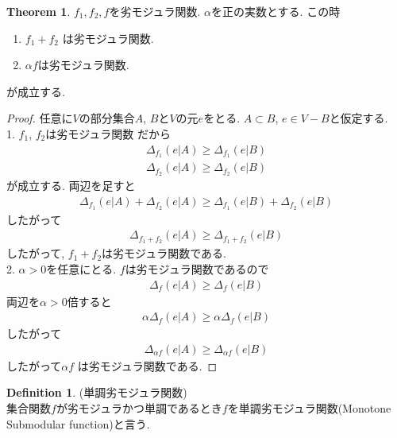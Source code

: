 \documentclass[11pt, a4paper, dvipdfmx]{jsarticle}
\theoremstyle{definition}
\newtheorem{Definition+}[Axiom+]{Definition}
\newtheorem{Theorem+}[Axiom+]{Theorem}
\begin{document}
\begin{Theorem+}
    $f_{1}, f_{2}, f$を劣モジュラ関数. $\alpha$を正の実数とする. この時
    \begin{enumerate}
        \item $f_{1} + f_{2} $ は劣モジュラ関数.
        \item $\alpha f$は劣モジュラ関数.
    \end{enumerate}
    が成立する.
    \begin{proof}
        任意に$V$の部分集合$A$, $B$と$V$の元$e$をとる. $A\subset B$, $e\in V - B$と仮定する.\\
        1. $f_{1}$, $f_{2}$は劣モジュラ関数 だから
        \begin{align*}
            \Delta_{f_{1}}(e|A)\geq \Delta_{f_{1}}(e|B)
        \end{align*}
        \begin{align*}
            \Delta_{f_{2}}(e|A)\geq \Delta_{f_{2}}(e|B)
        \end{align*}
        が成立する. 両辺を足すと
        \begin{align*}
            \Delta_{f_{1}}(e|A) + \Delta_{f_{2}}(e|A)\geq \Delta_{f_{1}}(e|B) + \Delta_{f_{2}}(e|B)
        \end{align*}
        したがって
        \begin{align*}
            \Delta_{f_{1} + f_{2}}(e|A)\geq \Delta_{f_{1} + f_{2}}(e|B)
        \end{align*}
        したがって, $f_{1} + f_{2}$は劣モジュラ関数である.\\
        2. $\alpha > 0$を任意にとる. $f$は劣モジュラ関数であるので
        \begin{align*}
            \Delta_{f}(e|A)\geq \Delta_{f}(e|B)
        \end{align*}
        両辺を$\alpha > 0$倍すると
        \begin{align*}
            \alpha\Delta_{f}(e|A)\geq \alpha\Delta_{f}(e|B)
        \end{align*}
        したがって
        \begin{align*}
            \Delta_{\alpha f}(e|A)\geq \Delta_{\alpha f}(e|B)
        \end{align*}
        したがって$\alpha f$ は劣モジュラ関数である.
     \end{proof}
\end{Theorem+}
\begin{Definition+}(単調劣モジュラ関数)\\
    集合関数$f$が劣モジュラかつ単調であるとき$f$を単調劣モジュラ関数(Monotone Submodular function)と言う.
\end{Definition+}
\end{document}

